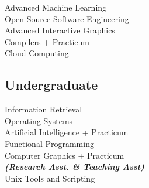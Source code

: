 \documentclass[letterpaper]{deedy-resume} %
\begin{document}
\begin{minipage}[t]{0.33\textwidth}
Advanced Machine Learning \\
Open Source Software Engineering \\
Advanced Interactive Graphics \\
Compilers + Practicum \\
Cloud Computing

\sectionspace


\subsection{Undergraduate}

Information Retrieval \\
Operating Systems \\
Artificial Intelligence + Practicum \\
Functional Programming \\
Computer Graphics + Practicum \\
{\footnotesize \textit{\textbf{(Research Asst. \& Teaching Asst) }}} \\
Unix Tools and Scripting

\sectionspace


\end{minipage} %
\hfill
%
%
\end{document}
